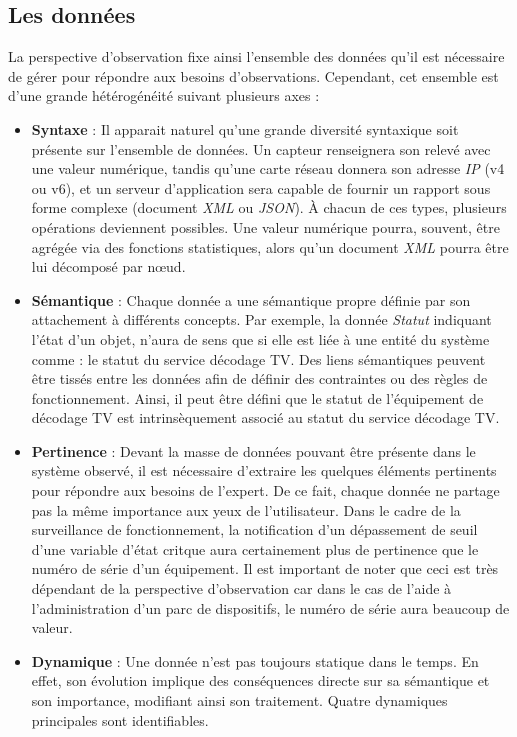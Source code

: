 \subsection{Les données}\label{sec:intro:problematique:data}
La perspective d'observation fixe ainsi l'ensemble des données qu'il est nécessaire de gérer pour répondre aux besoins d'observations. Cependant, cet ensemble est d'une grande hétérogénéité suivant plusieurs axes :
\begin{itemize}
 \item \textbf{Syntaxe} : Il apparait naturel qu'une grande diversité syntaxique soit présente sur l'ensemble de données. Un capteur renseignera son relevé avec une valeur numérique, tandis qu'une carte réseau donnera son adresse \textit{IP} (v4 ou v6), et un serveur d'application sera capable de fournir un rapport sous forme complexe (document \textit{XML} ou \textit{JSON}). À chacun de ces types, plusieurs opérations deviennent possibles. Une valeur numérique pourra, souvent, être agrégée via des fonctions statistiques, alors qu'un document \textit{XML} pourra être lui décomposé par nœud.
 \item \textbf{Sémantique} : Chaque donnée a une sémantique propre définie par son attachement à différents concepts. Par exemple, la donnée \textit{Statut} indiquant l'état d'un objet, n'aura de sens que si elle est liée à une entité du système comme : le statut du service décodage TV. Des liens sémantiques peuvent être tissés entre les données afin de définir des contraintes ou des règles de fonctionnement. Ainsi, il peut être défini que le statut de l'équipement de décodage TV est intrinsèquement associé au statut du service décodage TV. 
 \item \textbf{Pertinence} : Devant la masse de données pouvant être présente dans le système observé, il est nécessaire d'extraire les quelques éléments pertinents pour répondre aux besoins de l'expert. De ce fait, chaque donnée ne partage pas la même importance aux yeux de l'utilisateur. Dans le cadre de la surveillance de fonctionnement, la notification d'un dépassement de seuil d'une variable d'état critque aura certainement plus de pertinence que le numéro de série d'un équipement. Il est important de noter que ceci est très dépendant de la perspective d'observation car dans le cas de l'aide à l'administration d'un parc de dispositifs, le numéro de série aura beaucoup de valeur.
 \item \textbf{Dynamique} : Une donnée n'est pas toujours statique dans le temps. En effet, son évolution implique des conséquences directe sur sa sémantique et son importance, modifiant ainsi son traitement. Quatre dynamiques principales sont identifiables.

\end{itemize}
